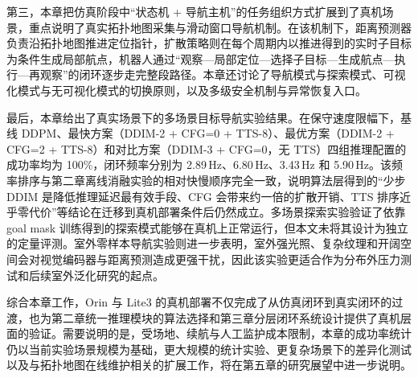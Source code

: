 第三，本章把仿真阶段中``状态机 + 导航主机''的任务组织方式扩展到了真机场景，重点说明了真实拓扑地图采集与滑动窗口导航机制。在该机制下，距离预测器负责沿拓扑地图推进定位指针，扩散策略则在每个周期内以推进得到的实时子目标为条件生成局部航点，机器人通过``观察—局部定位—选择子目标—生成航点—执行—再观察''的闭环逐步走完整段路径。本章还讨论了导航模式与探索模式、可视化模式与无可视化模式的切换原则，以及多级安全机制与异常恢复入口。

最后，本章给出了真实场景下的多场景目标导航实验结果。在保守速度限幅下，基线 DDPM、最快方案（DDIM-2 + CFG=0 + TTS-8）、最优方案（DDIM-2 + CFG=2 + TTS-8）和对比方案（DDIM-3 + CFG=0，无 TTS）四组推理配置的成功率均为 100\%，闭环频率分别为 2.89\,Hz、6.80\,Hz、3.43\,Hz 和 5.90\,Hz。该频率排序与第二章离线消融实验的相对快慢顺序完全一致，说明算法层得到的``少步 DDIM 是降低推理延迟最有效手段、CFG 会带来约一倍的扩散开销、TTS 排序近乎零代价''等结论在迁移到真机部署条件后仍然成立。多场景探索实验验证了依靠 goal mask 训练得到的探索模式能够在真机上正常运行，但本文未将其设计为独立的定量评测。室外零样本导航实验则进一步表明，室外强光照、复杂纹理和开阔空间会对视觉编码器与距离预测造成更强干扰，因此该实验更适合作为分布外压力测试和后续室外泛化研究的起点。

综合本章工作，Orin 与 Lite3 的真机部署不仅完成了从仿真闭环到真实闭环的过渡，也为第二章统一推理模块的算法选择和第三章分层闭环系统设计提供了真机层面的验证。需要说明的是，受场地、续航与人工监护成本限制，本章的成功率统计仍以当前实验场景规模为基础，更大规模的统计实验、更复杂场景下的差异化测试以及与拓扑地图在线维护相关的扩展工作，将在第五章的研究展望中进一步说明。
